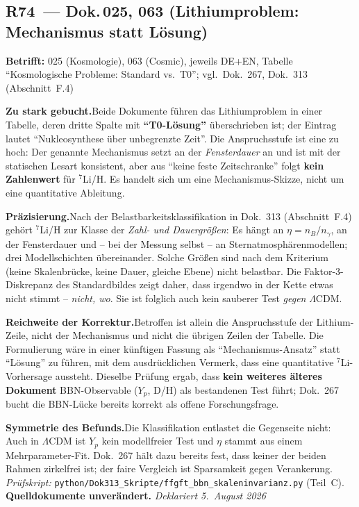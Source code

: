 \medskip

\subsection*{R74~--- Dok.\,025, 063 (Lithiumproblem: Mechanismus
statt Lösung)}

\noindent\textbf{Betrifft:} 025 (Kosmologie), 063 (Cosmic), jeweils
DE+EN, Tabelle \enquote{Kosmologische Probleme: Standard vs.\ T0};
vgl.\ Dok.~267, Dok.~313 (Abschnitt~F.4)

\smallskip\noindent\textbf{Zu stark gebucht.}\quad Beide Dokumente
führen das Lithiumproblem in einer Tabelle, deren dritte Spalte mit
\textbf{\enquote{T0-Lösung}} überschrieben ist; der Eintrag lautet
\enquote{Nukleosynthese über unbegrenzte Zeit}. Die Anspruchsstufe
ist eine zu hoch: Der genannte Mechanismus setzt an der
\emph{Fensterdauer} an und ist mit der statischen Lesart konsistent,
aber aus \enquote{keine feste Zeitschranke} folgt \textbf{kein
Zahlenwert} für $^{7}$Li/H. Es handelt sich um eine
Mechanismus-Skizze, nicht um eine quantitative Ableitung.

\smallskip\noindent\textbf{Präzisierung.}\quad Nach der
Belastbarkeitsklassifikation in Dok.~313 (Abschnitt~F.4) gehört
$^{7}$Li/H zur Klasse der \emph{Zahl- und Dauergrößen}: Es hängt an
$\eta = n_B/n_\gamma$, an der Fensterdauer und -- bei der Messung
selbst -- an Sternatmosphärenmodellen; drei Modellschichten
übereinander. Solche Größen sind nach dem Kriterium (keine
Skalenbrücke, keine Dauer, gleiche Ebene) nicht belastbar. Die
Faktor-$3$-Diskrepanz des Standardbildes zeigt daher, dass irgendwo
in der Kette etwas nicht stimmt -- \emph{nicht, wo}. Sie ist
folglich auch kein sauberer Test \emph{gegen} $\Lambda$CDM.

\smallskip\noindent\textbf{Reichweite der Korrektur.}\quad Betroffen
ist allein die Anspruchsstufe der Lithium-Zeile, nicht der
Mechanismus und nicht die übrigen Zeilen der Tabelle. Die
Formulierung wäre in einer künftigen Fassung als
\enquote{Mechanismus-Ansatz} statt \enquote{Lösung} zu führen, mit
dem ausdrücklichen Vermerk, dass eine quantitative $^{7}$Li-Vorhersage
aussteht. Dieselbe Prüfung ergab, dass \textbf{kein weiteres älteres
Dokument} BBN-Observable ($Y_p$, D/H) als bestandenen Test führt;
Dok.~267 bucht die BBN-Lücke bereits korrekt als offene
Forschungsfrage.

\smallskip\noindent\textbf{Symmetrie des Befunds.}\quad Die
Klassifikation entlastet die Gegenseite nicht: Auch in $\Lambda$CDM
ist $Y_p$ kein modellfreier Test und $\eta$ stammt aus einem
Mehrparameter-Fit. Dok.~267 hält dazu bereits fest, dass keiner der
beiden Rahmen zirkelfrei ist; der faire Vergleich ist Sparsamkeit
gegen Verankerung. \emph{Prüfskript:}
\texttt{python/Dok313\_Skripte/ffgft\_bbn\_skaleninvarianz.py}
(Teil~C). \textbf{Quelldokumente unverändert.}
\emph{Deklariert 5.~August 2026}

